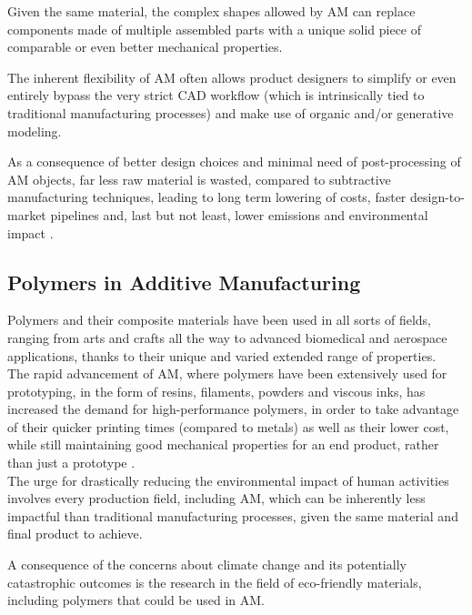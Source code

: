 \documentclass{article}
\begin{document}
    Given the same material, the complex shapes allowed by AM can replace components made of multiple assembled parts with a unique solid piece of comparable or even better mechanical properties. 
    
    The inherent flexibility of AM often allows product designers to simplify or even entirely bypass the very strict CAD workflow (which is intrinsically tied to 
    traditional manufacturing processes) and make use of organic and/or generative modeling. 

    As a consequence of better design choices and minimal need of post-processing of AM objects, far less raw material is wasted, compared to subtractive manufacturing techniques, leading to 
    long term lowering of costs, faster design-to-market pipelines and, last but not least, lower emissions and environmental impact \autocite*{Recent_progress_polymers_AM}. 

    \subsection{Polymers in Additive Manufacturing\label{Polymers_in_AM}}

    Polymers and their composite materials have been used in all sorts of fields, ranging from arts and crafts all the way to advanced biomedical and aerospace applications, thanks 
    to their unique and varied extended range of properties. \\  
    
    The rapid advancement of AM, where polymers have been extensively used for prototyping, in the form of resins, filaments, powders and viscous inks, 
    has increased the demand for high-performance polymers, in order to take advantage of their quicker printing times (compared to metals) as well as their lower cost, while still
    maintaining good mechanical properties for an end product, rather than just a prototype \autocite*{Recent_progress_polymers_AM}. \\ 

    The urge for drastically reducing the environmental impact of human activities involves every production field, including AM, which can be inherently less impactful
    than traditional manufacturing processes, given the same material and final product to achieve. 

    A consequence of the concerns about climate change and its potentially catastrophic outcomes is the research in the field of eco-friendly materials, including polymers 
    that could be used in AM. 
    
\end{document}
